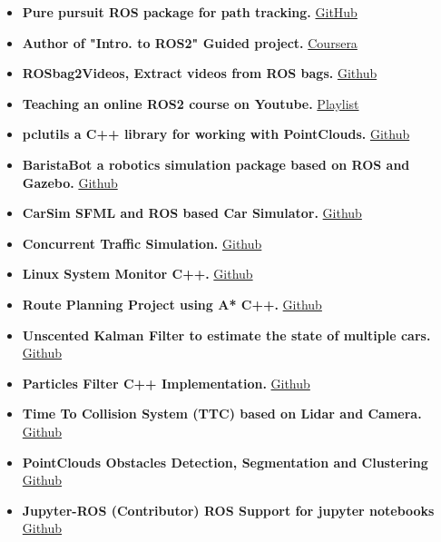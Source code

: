 \documentclass[10pt,a4paper,ragged2e]{altacv}
\begin{document}
\begin{itemize}
\item \textbf{Pure pursuit ROS package for path tracking.}
\href{https://github.com/HemaZ/pure_pursuit}{GitHub}
\item \textbf{Author of "Intro. to ROS2" Guided project.}
\href{https://www.coursera.org/projects/ros2-intro}{Coursera}
\item \textbf{ROSbag2Videos, Extract videos from ROS bags.}
\href{https://github.com/HemaZ/rosbag_2_videos}{Github}
\item \textbf{Teaching an online ROS2 course on Youtube.}
\href{https://www.youtube.com/playlist?list=PLWIFvNcdSDQupEsNLnAnCI6MwTqvGgkC1}{Playlist}
\item \textbf{pclutils a C++ library for working with PointClouds.}
\href{https://github.com/HemaZ/pcl_utils}{Github}
\item \textbf{BaristaBot a robotics simulation package based on ROS and Gazebo.}
\href{https://github.com/HemaZ/BaristaBot}{Github}
\item \textbf{CarSim SFML and ROS based Car Simulator.}
\href{https://github.com/HemaZ/CarSim}{Github}
\item \textbf{Concurrent Traffic Simulation.}
\href{https://github.com/HemaZ/Concurrent-Traffic-Simulation-CPP}{Github}
\item \textbf{Linux System Monitor C++.}
\href{https://github.com/HemaZ/CppND-System-Monitor}{Github}
\item \textbf{Route Planning Project using A* C++.}
\href{https://github.com/HemaZ/CppND-Route-Planning-Project}{Github}
\item \textbf{Unscented Kalman Filter to estimate the state of multiple cars.}
\href{https://github.com/HemaZ/SFND_Unscented_Kalman_Filter}{Github}
\item \textbf{Particles Filter C++ Implementation.}
\href{https://github.com/HemaZ/particles_filter}{Github}
\item \textbf{Time To Collision System (TTC) based on Lidar and Camera.}
\href{https://github.com/HemaZ/SFND_3D_Object_Tracking}{Github}

\item \textbf{PointClouds Obstacles Detection, Segmentation and Clustering}
\href{https://github.com/HemaZ/SFND_Lidar_Obstacle_Detection}{Github}

\item \textbf{Jupyter-ROS (Contributor)  ROS Support for jupyter notebooks}
\href{https://github.com/RoboStack/jupyter-ros}{Github}


\end{itemize}
\end{document}
